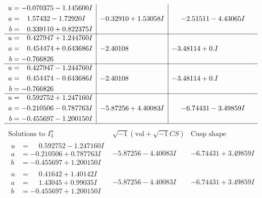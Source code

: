 \documentclass[1p]{elsarticle_modified}
\theoremstyle{definition}
\newcommand{\I}{\sqrt{-1}}
\begin{document}
$$\begin{array}{c|c|c}
\begin{aligned}
u &= -0.070375 - 1.145600 I \\
a &= \phantom{-}1.57432 - 1.72920 I \\
b &= \phantom{-}0.339110 + 0.822375 I\end{aligned}
 & -0.32910 + 1.53058 I & -2.51511 - 4.43065 I \\ \hline\begin{aligned}
u &= \phantom{-}0.427947 + 1.244760 I \\
a &= \phantom{-}0.454474 + 0.643686 I \\
b &= -0.766826\phantom{ +0.000000I}\end{aligned}
 & -2.40108\phantom{ +0.000000I} & -3.48114 + 0. I\phantom{ +0.000000I} \\ \hline\begin{aligned}
u &= \phantom{-}0.427947 - 1.244760 I \\
a &= \phantom{-}0.454474 - 0.643686 I \\
b &= -0.766826\phantom{ +0.000000I}\end{aligned}
 & -2.40108\phantom{ +0.000000I} & -3.48114 + 0. I\phantom{ +0.000000I} \\ \hline\begin{aligned}
u &= \phantom{-}0.592752 + 1.247160 I \\
a &= -0.210506 - 0.787763 I \\
b &= -0.455697 - 1.200150 I\end{aligned}
 & -5.87256 + 4.40083 I & -6.74431 - 3.49859 I\\
 \hline 
 \end{array}$$\newpage$$\begin{array}{c|c|c}  
\text{Solutions to }I^u_{3}& \I (\text{vol} + \sqrt{-1}CS) & \text{Cusp shape}\\
 \hline 
\begin{aligned}
u &= \phantom{-}0.592752 - 1.247160 I \\
a &= -0.210506 + 0.787763 I \\
b &= -0.455697 + 1.200150 I\end{aligned}
 & -5.87256 - 4.40083 I & -6.74431 + 3.49859 I \\ \hline\begin{aligned}
u &= \phantom{-}0.41642 + 1.40142 I \\
a &= \phantom{-}1.43045 + 0.99035 I \\
b &= -0.455697 + 1.200150 I\end{aligned}
 & -5.87256 - 4.40083 I & -6.74431 + 3.49859 I \\ \hline\begin{aligned}

\end{aligned}
\end{array}$$
\end{document}
